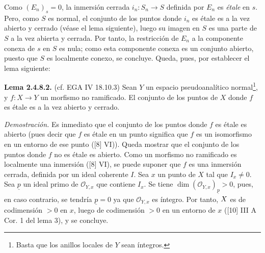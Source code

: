 Como $(E_n)_s=0$, la inmersión cerrada $i_n:S_n\longrightarrow S$ definida por $E_n$ es \emph{étale} en $s$. Pero, como $S$ es normal, el conjunto de los puntos donde $i_n$ es étale es a la vez abierto y cerrado (véase el lema siguiente), luego su imagen en $S$ es una parte de $S$ a la vez abierta y cerrada. Por tanto, la restricción de $E_n$ a la componente conexa de $s$ en $S$ es nula; como esta componente conexa es un conjunto abierto, puesto que $S$ es localmente conexo, se concluye. Queda, pues, por establecer el lema siguiente:

\textbf{Lema 2.4.8.2.} (cf. EGA IV 18.10.3) Sean $Y$ un espacio pseudoanalítico normal\footnote{Basta que los anillos locales de $Y$ sean íntegros.}, y $f:X\longrightarrow Y$ un morfismo no ramificado. El conjunto de los puntos de $X$ donde $f$ es étale es a la vez abierto y cerrado.

\emph{Demostración.} Es inmediato que el conjunto de los puntos donde $f$ es étale es abierto (pues decir que $f$ es étale en un punto significa que $f$ es un isomorfismo en un entorno de ese punto ([8] VI)). Queda mostrar que el conjunto de los puntos donde $f$ no es étale es abierto. Como un morfismo no ramificado es localmente una inmersión ([8] VI), se puede suponer que $f$ es una inmersión cerrada, definida por un ideal coherente $I$. Sea $x$ un punto de $X$ tal que $I_x\ne0$. Sea $\underline p$ un ideal primo de $\mathcal O_{Y,x}$ que contiene $I_x$. Se tiene $\dim(\mathcal O_{Y,x})_{\underline p}>0$, pues, en caso contrario, se tendría $\underline p=0$ ya que $\mathcal O_{Y,x}$ es íntegro. Por tanto, $\sisi{Y}{X}$ es de codimensión $>0$ en $x$, luego de codimensión $>0$ en un entorno de $x$ ([10] III A Cor. 1 del lema 3), y se concluye.

